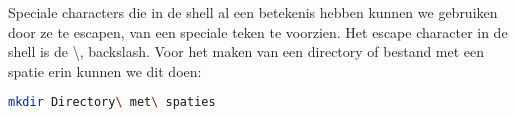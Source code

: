 Speciale characters die in de shell al een betekenis hebben kunnen we gebruiken door ze te escapen, van een speciale teken te voorzien. Het escape character in de shell is de \textbackslash, backslash. Voor het maken van een directory of bestand met een spatie erin kunnen we dit doen:
\begin{lstlisting}[language=bash]
mkdir Directory\ met\ spaties
\end{lstlisting}
